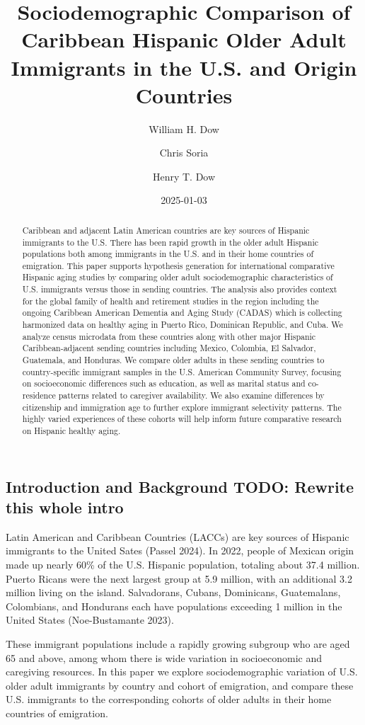 \documentclass[
]{article}
\title{Sociodemographic Comparison of Caribbean Hispanic Older Adult
Immigrants in the U.S. and Origin Countries}
\author{William H. Dow \and Chris Soria \and Henry T. Dow}
\date{2025-01-03}
\begin{document}
\maketitle
\begin{abstract}
Caribbean and adjacent Latin American countries are key sources of
Hispanic immigrants to the U.S. There has been rapid growth in the older
adult Hispanic populations both among immigrants in the U.S. and in
their home countries of emigration. This paper supports hypothesis
generation for international comparative Hispanic aging studies by
comparing older adult sociodemographic characteristics of U.S.
immigrants versus those in sending countries. The analysis also provides
context for the global family of health and retirement studies in the
region including the ongoing Caribbean American Dementia and Aging Study
(CADAS) which is collecting harmonized data on healthy aging in Puerto
Rico, Dominican Republic, and Cuba. We analyze census microdata from
these countries along with other major Hispanic Caribbean-adjacent
sending countries including Mexico, Colombia, El Salvador, Guatemala,
and Honduras. We compare older adults in these sending countries to
country-specific immigrant samples in the U.S. American Community
Survey, focusing on socioeconomic differences such as education, as well
as marital status and co-residence patterns related to caregiver
availability. We also examine differences by citizenship and immigration
age to further explore immigrant selectivity patterns. The highly varied
experiences of these cohorts will help inform future comparative
research on Hispanic healthy aging.
\end{abstract}


\subsection{Introduction and Background TODO: Rewrite this whole
intro}\label{sec-intro}

Latin American and Caribbean Countries (LACCs) are key sources of
Hispanic immigrants to the United Sates (Passel 2024). In 2022, people
of Mexican origin made up nearly 60\% of the U.S. Hispanic population,
totaling about 37.4 million. Puerto Ricans were the next largest group
at 5.9 million, with an additional 3.2 million living on the island.
Salvadorans, Cubans, Dominicans, Guatemalans, Colombians, and Hondurans
each have populations exceeding 1 million in the United States
(Noe-Bustamante 2023).

These immigrant populations include a rapidly growing subgroup who are
aged 65 and above, among whom there is wide variation in socioeconomic
and caregiving resources. In this paper we explore sociodemographic
variation of U.S. older adult immigrants by country and cohort of
emigration, and compare these U.S. immigrants to the corresponding
cohorts of older adults in their home countries of emigration.
\end{document}
